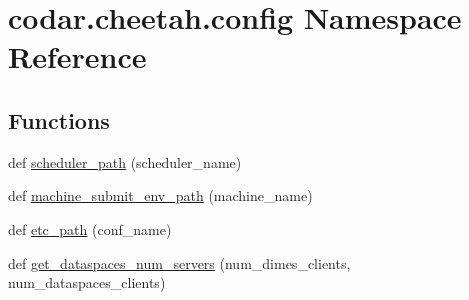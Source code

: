 \hypertarget{namespacecodar_1_1cheetah_1_1config}{}\section{codar.\+cheetah.\+config Namespace Reference}
\label{namespacecodar_1_1cheetah_1_1config}
\subsection*{Functions}
\begin{DoxyCompactItemize}
\item 
def \hyperlink{namespacecodar_1_1cheetah_1_1config_ae1608746b2c45e5199964e986dbc66da}{scheduler\+\_\+path} (scheduler\+\_\+name)
\item 
def \hyperlink{namespacecodar_1_1cheetah_1_1config_a906f4dbe8936921e615b9cc8eae8383f}{machine\+\_\+submit\+\_\+env\+\_\+path} (machine\+\_\+name)
\item 
def \hyperlink{namespacecodar_1_1cheetah_1_1config_a1028977b1cc5dc7f54bd65cb46256c8d}{etc\+\_\+path} (conf\+\_\+name)
\item 
def \hyperlink{namespacecodar_1_1cheetah_1_1config_a777b4339975017c9521b943afd76748d}{get\+\_\+dataspaces\+\_\+num\+\_\+servers} (num\+\_\+dimes\+\_\+clients, num\+\_\+dataspaces\+\_\+clients)
\end{DoxyCompactItemize}
